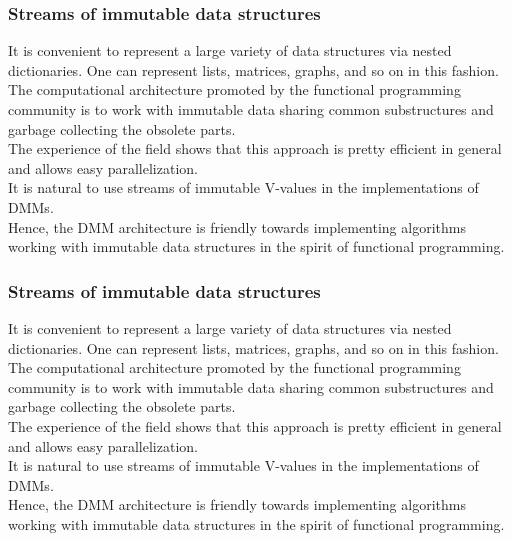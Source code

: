 \documentclass{beamer}
\newcommand{\msgray}[1]{{\color{mygray} #1}}
\begin{document}
\begin{frame}

  \frametitle{Streams of immutable data structures}

It is convenient to represent a large variety of data structures via nested dictionaries. One can represent lists, matrices, graphs, and so on in this fashion.\\[1ex]

The computational architecture promoted by the functional programming community is to work with immutable data sharing common substructures and garbage collecting the obsolete parts.\\[1ex]

\msgray{The experience of the field shows that this approach is pretty efficient in general and allows easy parallelization.\\[1ex]

It is natural to use streams of immutable V-values in the implementations of DMMs.\\[1ex]

Hence, the DMM architecture is friendly towards implementing algorithms working with immutable data structures in
the spirit of functional programming.}

\end{frame}

\begin{frame}

  \frametitle{Streams of immutable data structures}

It is convenient to represent a large variety of data structures via nested dictionaries. One can represent lists, matrices, graphs, and so on in this fashion.\\[1ex]

The computational architecture promoted by the functional programming community is to work with immutable data sharing common substructures and garbage collecting the obsolete parts.\\[1ex]

The experience of the field shows that this approach is pretty efficient in general and allows easy parallelization.\\[1ex]

\msgray{It is natural to use streams of immutable V-values in the implementations of DMMs.\\[1ex]

Hence, the DMM architecture is friendly towards implementing algorithms working with immutable data structures in
the spirit of functional programming.}

\end{frame}
\end{document}

